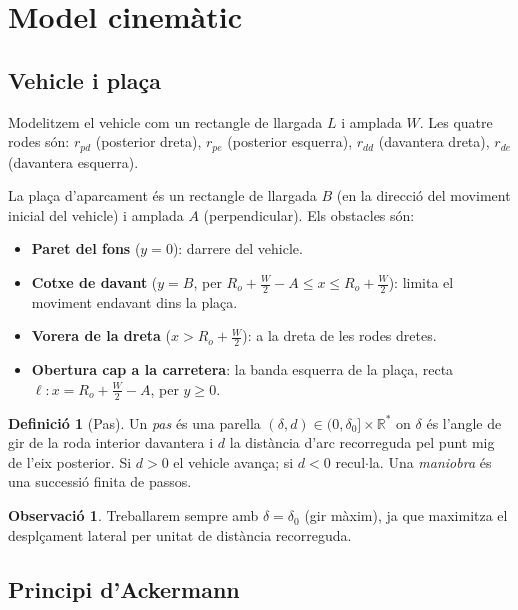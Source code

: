 \documentclass[11pt, a4paper]{article}
\theoremstyle{plain}
\theoremstyle{definition}
\newtheorem{definition}[theorem]{Definici\'o}
\newtheorem{remark}[theorem]{Observaci\'o}
\newcommand{\Ro}{R_o}
\begin{document}
\section{Model cinem\`atic}\label{sec:model}

\subsection{Vehicle i pla\c{c}a}

Modelitzem el vehicle com un rectangle de llargada $L$ i amplada $W$.
Les quatre rodes s\'on: $r_{pd}$ (posterior dreta), $r_{pe}$ (posterior
esquerra), $r_{dd}$ (davantera dreta), $r_{de}$ (davantera esquerra).

La pla\c{c}a d'aparcament \'es un rectangle de llargada $B$ (en la direcci\'o
del moviment inicial del vehicle) i amplada $A$ (perpendicular). Els obstacles
s\'on:
\begin{itemize}[noitemsep]
  \item \textbf{Paret del fons} ($y=0$): darrere del vehicle.
  \item \textbf{Cotxe de davant} ($y=B$, per $\Ro+\frac{W}{2}-A \leq x
        \leq \Ro+\frac{W}{2}$): limita el moviment endavant dins la pla\c{c}a.
  \item \textbf{Vorera de la dreta} ($x > \Ro+\frac{W}{2}$): a la dreta
        de les rodes dretes.
  \item \textbf{Obertura cap a la carretera}: la banda esquerra de la
        pla\c{c}a, recta $\ell: x = \Ro+\frac{W}{2}-A$, per $y\geq 0$.
\end{itemize}

\begin{definition}[Pas]\label{def:pas}
Un \emph{pas} \'es una parella $(\delta,d)\in(0,\delta_0]\times\mathbb{R}^*$
on $\delta$ \'es l'angle de gir de la roda interior davantera i $d$ la
dist\`ancia d'arc recorreguda pel punt mig de l'eix posterior. Si $d>0$ el
vehicle avan\c{c}a; si $d<0$ recul$\cdot$la. Una \emph{maniobra} \'es una
successi\'o finita de passos.
\end{definition}

\begin{remark}
Treballarem sempre amb $\delta=\delta_0$ (gir m\`axim), ja que maximitza
el despl\c{c}ament lateral per unitat de dist\`ancia recorreguda.
\end{remark}

\subsection{Principi d'Ackermann}
\end{document}
